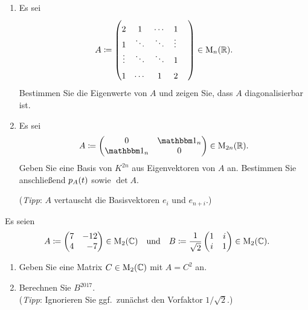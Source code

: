 \documentclass[a4paper, 10pt]{scrartcl}
\begin{document}
\begin{question}[subtitle = Diagonalisieren]
  \begin{enumerate}
    \item
      Es sei
      \[
                  A
        \coloneqq \begin{pmatrix}
                    2       & 1       & \cdots  & 1       \phantom{\ddots}  \\
                    1       & \ddots  & \ddots  & \vdots  \phantom{\ddots}  \\
                    \vdots  & \ddots  & \ddots  & 1       \phantom{\ddots}  \\
                    1       & \cdots  & 1       & 2       \phantom{\ddots}
                  \end{pmatrix}
        \in       \operatorname{M}_{n}(\mathbb{R}).
      \]
      Bestimmen Sie die Eigenwerte von $A$ und zeigen Sie, dass $A$ diagonalisierbar ist.
    \item
      Es sei
      \[
                  A
        \coloneqq \begin{pmatrix}
                    0     & \Id_n \\
                    \Id_n & 0
                  \end{pmatrix}
        \in       \matrices{2n}{\Real}.
      \]
      Geben Sie eine Basis von $K^{2n}$ aus Eigenvektoren von $A$ an.
      Bestimmen Sie anschließend $p_{A}(t)$ sowie $\det A$.
      
      (\emph{Tipp}: $A$ vertauscht die Basisvektoren $e_i$ und $e_{n+i}$.)
  \end{enumerate}
\end{question}





\begin{question}[subtitle = Wurzeln und Potenzen]
  Es seien
  \[
              A
    \coloneqq \begin{pmatrix*}[r]
                7 & -12 \\
                4 &  -7
              \end{pmatrix*}
              \in \matrices{2}{\Complex}
    \quad\text{und}\quad
              B
    \coloneqq \frac{1}{\sqrt{2}}
              \begin{pmatrix}
                1 & i \\
                i & 1
              \end{pmatrix}
              \in \matrices{2}{\Complex}.
  \]
  \begin{enumerate}
    \item
      Geben Sie eine Matrix $C \in \operatorname{M}_{2}(\mathbb{C})$ mit $A = C^2$ an.
    \item
      Berechnen Sie $B^{2017}$.
      \\
      (\emph{Tipp}:
       Ignorieren Sie ggf.\ zunächst den Vorfaktor $1/\sqrt{2}$.)
  \end{enumerate}
\end{question}
\end{document}
